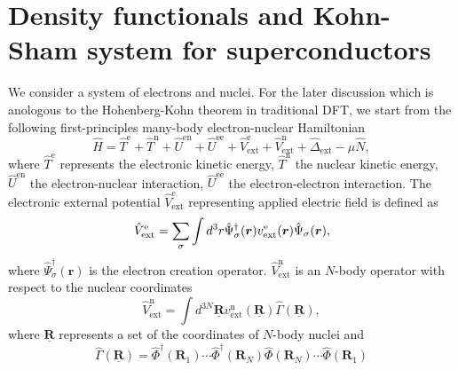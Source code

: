 \section{Density functionals and Kohn-Sham system for superconductors}
We consider a system of electrons and nuclei. For the later discussion which is anologous to the 
Hohenberg-Kohn theorem in traditional DFT, we start from the following
first-principles many-body electron-nuclear Hamiltonian
%
\begin{equation}  %
\label{eq:Hamil}
   \hat{H} = \hat{T}^\mathrm{e} + \hat{T}^\mathrm{n} + \hat{U}^\mathrm{en} + \hat{U}^\mathrm{ee}
                   + \hat{V}^\mathrm{e}_\mathrm{ext} + \hat{V}^\mathrm{n}_\mathrm{ext}
                   + \hat{\Delta}_\mathrm{ext} - \mu\hat{N},
\end{equation} 
%
where $\hat{T}^\mathrm{e}$ represents the electronic kinetic energy, $\hat{T}^\mathrm{n}$ the nuclear kinetic energy, 
$\hat{U}^\mathrm{en}$ the electron-nuclear interaction, $\hat{U}^\mathrm{ee}$ the electron-electron interaction.
The electronic external potential $\hat{V}^\mathrm{e}_\mathrm{ext}$ representing applied electric field is defined as
%
\begin{equation} %
	\hat{V}^\mathrm{e}_\mathrm{ext} = \sum_{\sigma}\int d^3r\hat{\Psi}^\dag_{\sigma}({\bm r})
	                                                            v^\mathrm{e}_{\rm ext}(\bm{r})\hat{\Psi}_{\sigma}(\bm{r}), 
\end{equation} 
%
where $\hat{\Psi}^\dag_{\sigma}({\bm r})$ is the electron creation operator. 
$\hat{V}^\mathrm{n}_\mathrm{ext}$  is an $N$-body operator with respect to the nuclear coordinates
%
\begin{equation} %
	\hat{V}^\mathrm{n}_\mathrm{ext} = \int d^{3N}\underline{\bm{R}}
                                          v^\mathrm{n}_\mathrm{ext}(\underline{\bm{R}})
                                          \hat{\Gamma}(\underline{\bm{R}}),
\end{equation} 
%
where $\underline{\bm{R}}$ represents a set of the coordinates of $N$-body nuclei and 
%
\begin{equation} %
	\hat{\Gamma}(\underline{\bm{R}}) = \hat{\Phi}^\dag \left(\bm{R}_1 \right) \cdots \hat{\Phi}^\dag \left(\bm{R}_N \right)
	                                                          \hat{\Phi} \left(\bm{R}_N \right) \cdots \hat{\Phi} \left(\bm{R}_1 \right)
\end{equation} 
